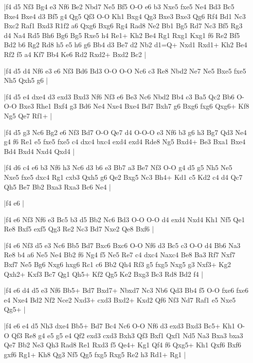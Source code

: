 \whitename{}
\blackname{}
\makegametitle
|f4 d5 Nf3 Bg4 e3 Nf6 Be2 Nbd7 Ne5 Bf5 O-O e6 b3 Nxe5 fxe5 Ne4 Bd3 Bc5 Bxe4 Bxe4 d3 Bf5 g4 Qg5 Qf3 O-O Kh1 Bxg4 Qg3 Bxe3 Bxe3 Qg6 Rf4 Bd1 Nc3 Bxc2 Raf1 Bxd3 R1f2 a6 Qxg6 Bxg6 Rg4 Rad8 Ne2 Bb1 Bg5 Rd7 Nc3 Bf5 Rg3 d4 Na4 Rd5 Bh6 Bg6 Bg5 Rxe5 h4 Re1+ Kh2 Be4 Rg1 Rxg1 Kxg1 f6 Re2 Bf5 Bd2 b6 Rg2 Rd8 h5 e5 h6 g6 Bb4 d3 Be7 d2 Nb2 d1=Q+ Nxd1 Rxd1+ Kh2 Be4 Rf2 f5 a4 Kf7 Bb4 Ke6 Rd2 Rxd2+ Bxd2 Bc2  |

\whitename{}
\blackname{}
\makegametitle
|f4 d5 d4 Nf6 e3 e6 Nf3 Bd6 Bd3 O-O O-O Nc6 c3 Re8 Nbd2 Ne7 Ne5 Bxe5 fxe5 Nh5 Qxh5 g6  |

\whitename{}
\blackname{}
\makegametitle
|f4 d5 e4 dxe4 d3 exd3 Bxd3 Nf6 Nf3 e6 Be3 Nc6 Nbd2 Bb4 c3 Ba5 Qc2 Bb6 O-O-O Bxe3 Rhe1 Bxf4 g3 Bd6 Ne4 Nxe4 Bxe4 Bd7 Bxh7 g6 Bxg6 fxg6 Qxg6+ Kf8 Ng5 Qe7 Rf1+  |

\whitename{}
\blackname{}
\makegametitle
|f4 d5 g3 Nc6 Bg2 e6 Nf3 Bd7 O-O Qe7 d4 O-O-O e3 Nf6 b3 g6 h3 Bg7 Qd3 Ne4 g4 f6 Re1 e5 fxe5 fxe5 c4 dxc4 bxc4 exd4 exd4 Rde8 Ng5 Bxd4+ Be3 Bxa1 Bxe4 Bd4 Bxd4 Nxd4 Qxd4  |

\whitename{}
\blackname{}
\makegametitle
|f4 d6 c4 e6 b3 Nf6 h3 Nc6 d3 b6 e3 Bb7 a3 Be7 Nf3 O-O g4 d5 g5 Nh5 Ne5 Nxe5 fxe5 dxc4 Rg1 cxb3 Qxh5 g6 Qe2 Bxg5 Nc3 Bh4+ Kd1 c5 Kd2 c4 d4 Qc7 Qh5 Be7 Bb2 Bxa3 Rxa3 Bc6 Ne4  |

\whitename{}
\blackname{}
\makegametitle
|f4 e6  |

\whitename{}
\blackname{}
\makegametitle
|f4 e6 Nf3 Nf6 e3 Bc5 b3 d5 Bb2 Nc6 Bd3 O-O O-O d4 exd4 Nxd4 Kh1 Nf5 Qe1 Re8 Bxf5 exf5 Qg3 Re2 Nc3 Bd7 Nxe2 Qe8 Bxf6  |

\whitename{}
\blackname{}
\makegametitle
|f4 e6 Nf3 d5 e3 Nc6 Bb5 Bd7 Bxc6 Bxc6 O-O Nf6 d3 Bc5 c3 O-O d4 Bb6 Na3 Re8 b4 a6 Ne5 Ne4 Bb2 f6 Ng4 f5 Ne5 Re7 c4 dxc4 Naxc4 Be8 Ba3 Rf7 Nxf7 Bxf7 Ne5 Bg6 Nxg6 hxg6 Rc1 c6 Bb2 Qh4 Rf3 g5 fxg5 Nxg5 g3 Nxf3+ Kg2 Qxh2+ Kxf3 Bc7 Qg1 Qh5+ Kf2 Qg5 Ke2 Bxg3 Bc3 Rd8 Bd2 f4  |

\whitename{}
\blackname{}
\makegametitle
|f4 e6 d4 d5 e3 Nf6 Bb5+ Bd7 Bxd7+ Nbxd7 Nc3 Nb6 Qd3 Bb4 f5 O-O fxe6 fxe6 e4 Nxe4 Bd2 Nf2 Nce2 Nxd3+ cxd3 Bxd2+ Kxd2 Qf6 Nf3 Nd7 Raf1 e5 Nxe5 Qg5+  |

\whitename{}
\blackname{}
\makegametitle
|f4 e6 e4 d5 Nh3 dxe4 Bb5+ Bd7 Bc4 Nc6 O-O Nf6 d3 exd3 Bxd3 Bc5+ Kh1 O-O Qf3 Re8 g4 e5 g5 e4 Qf2 exd3 cxd3 Bxh3 Qf3 Bxf1 Qxf1 Nd5 Na3 Bxa3 bxa3 Qe7 Bb2 Ne3 Qh3 Rad8 Re1 Rxd3 f5 Qe4+ Kg1 Qf4 f6 Qxg5+ Kh1 Qxf6 Bxf6 gxf6 Rg1+ Kh8 Qg3 Nf5 Qg5 fxg5 Rxg5 Re2 h3 Rd1+ Rg1  |

